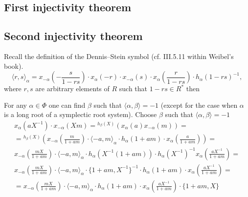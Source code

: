 \documentclass[oneside, 10pt]{amsart}
\theoremstyle{remark} %
\theoremstyle{definition}
\begin{document}
\subsection{First injectivity theorem}
\subsection{Second injectivity theorem}

Recall the definition of the Dennis--Stein symbol (cf. III.5.11 within Weibel's book).
\[ \langle r,s \rangle _ \alpha = x_{-\alpha}\left(-\frac{s}{1 - rs}\right) \cdot x_{\alpha}(-r) \cdot x_{-\alpha}(s) \cdot x_{\alpha}\left(\frac{r}{1-rs}\right) \cdot h_{\alpha}(1 - rs)^{-1}, \]
where $r, s$ are arbitrary elements of $R$ such that $1 - rs\in R^*$ then

\begin{comment}
\[x_{\alpha}(aX^{-1}) x_{-\alpha}(mX) x_{\alpha}(-a(1+am)^{-1}X^{-1}) \cdot \{X, 1+am\} \in G_+.\]
$y := x_{\alpha}(aX^{-1}) x_{-\alpha}(mX) x_{\alpha}(-a(1+am)^{-1}X^{-1})$, 
$z = x_{-\alpha}(-m(1+am)^{-1}X) y h_{\alpha}((1+am)^{-1})$,
Using $\pi(z) = 1$ we get 
\begin{multline}z = z^{h_{ik}^{-1}(X)} = \\ x_{ji}(-m(1+am)^{-1}) x_{ij}(a) x_{ji}(m) \cdot x_{ij}(-a(1+am)^{-1})\{X, (1+am)^{-1}\} \cdot h_{ij}((1+am)^{-1}) \in G. \end{multline}
\end{comment}

For any $\alpha \in \Phi$ one can find $\beta$ such that $\langle \alpha, \beta \rangle = -1$
(except for the case when $\alpha$ is a long root of a symplectic root system).
Choose $\beta$ such that $\langle \alpha, \beta \rangle = -1$
\begin{multline}
 x_\alpha(aX^{-1}) \cdot x_{-\alpha}(X m) %
 = {}^{h_\beta(X)}(x_\alpha(a) x_{-\alpha}(m)) = \\
 = {}^{h_\beta(X)}\left( x_{-\alpha}\left(\frac{m}{1+am}\right) \cdot \langle -a, m\rangle_\alpha \cdot h_\alpha(1+am) \cdot x_\alpha\left(\frac{a}{1+am}\right) \right) = \\
 x_{-\alpha}\left(\frac{mX}{1+am}\right) \cdot \langle -a, m\rangle_\alpha \cdot h_\alpha(X^{-1}(1+am))\cdot h_\alpha(X^{-1})^{-1} x_{\alpha}\left(\frac{aX^{-1}}{1+am}\right) = \\
 x_{-\alpha}\left(\frac{mX}{1+am}\right) \cdot \langle -a, m\rangle_\alpha \cdot \{1+am, X^{-1}\}^{-1} \cdot h_\alpha(1+am)\cdot x_{\alpha}\left(\frac{aX^{-1}}{1+am}\right) = \\
 = x_{-\alpha}\left(\frac{mX}{1+am}\right) \cdot \langle -a, m\rangle_\alpha \cdot h_\alpha(1+am) \cdot x_{\alpha}\left(\frac{aX^{-1}}{1+am}\right) \cdot \{1+am, X\}
\end{multline}
\end{document}
